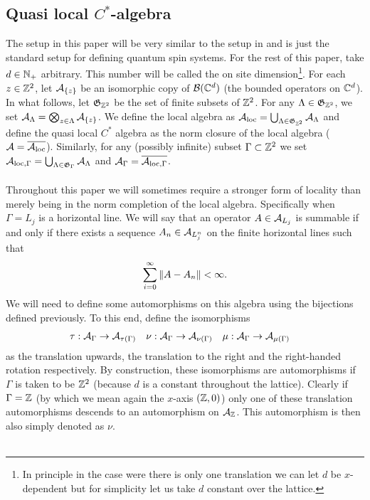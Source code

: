 \documentclass[11pt,a4paper,twoside]{article}
\numberwithin{equation}{section}
\begin{document}
\subsection{Quasi local $C^*$-algebra}\label{sec:QuasiLocalC*Algebra}
The setup in this paper will be very similar to the setup in \cite{ogata2021h3gmathbb} and is just the standard setup for defining quantum spin systems. For the rest of this paper, take $d\in\NN_+$ arbitrary. This number will be called the on site dimension\footnote{In principle in the case were there is only one translation we can let $d$ be $x$-dependent but for simplicity let us take $d$ constant over the lattice.}. For each $z\in\ZZ^2$, let $\AA_{\{z\}}$ be an isomorphic copy of $\BB(\CC^d)$ (the bounded operators on $\CC^d$). In what follows, let $\mathfrak{G}_{\ZZ^2}$ be the set of finite subsets of $\ZZ^2$. For any $\Lambda\in\mathfrak{G}_{\ZZ^2}$, we set $\AA_\Lambda=\bigotimes_{z\in\Lambda}\AA_{\{z\}}$. We define the local algebra as $\AA_{\text{loc}}=\bigcup_{\Lambda\in \mathfrak{G}_{\ZZ^2}}\AA_{\Lambda}$ and define the quasi local $C^*$ algebra as the norm closure of the local algebra ($\AA=\overline{\AA_{\text{loc}}}$). Similarly, for any (possibly infinite) subset $\Gamma\subset\ZZ^2$ we set $\AA_{\text{loc},\Gamma}=\bigcup_{\Lambda\in \mathfrak{G}_{\Gamma}}\AA_{\Lambda}$ and $\AA_\Gamma=\overline{\AA_{\text{loc},\Gamma}}$.\\\\
Throughout this paper we will sometimes require a stronger form of locality than merely being in the norm completion of the local algebra. Specifically when $\Gamma=L_j$ is a horizontal line. We will say that an operator $A\in\AA_{L_j}$ is summable if and only if there exists a sequence $A_n\in\AA_{L_{j}^n}$ on the finite horizontal lines such that
\begin{equation}
	\sum_{i=0}^{\infty}\norm{A-A_n}<\infty.
\end{equation}
We will need to define some automorphisms on this algebra using the bijections defined previously. To this end, define the isomorphisms
\begin{align}
\tau&:\AA_\Gamma\rightarrow\AA_{\tau(\Gamma)}&\nu&:\AA_\Gamma\rightarrow\AA_{\nu(\Gamma)}&\mu&:\AA_\Gamma\rightarrow\AA_{\mu(\Gamma)}
\end{align}
as the translation upwards, the translation to the right and the right-handed rotation respectively. By construction, these isomorphisms are automorphisms if $\Gamma$ is taken to be $\ZZ^2$ (because $d$ is a constant throughout the lattice). Clearly if $\Gamma=\ZZ$ (by which we mean again the $x$-axis $(\ZZ,0)$) only one of these translation automorphisms descends to an automorphism on $\AA_{\ZZ}$. This automorphism is then also simply denoted as $\nu$.\\\\
\end{document}
